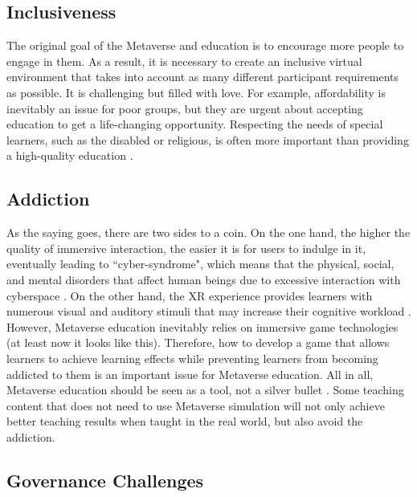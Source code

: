 \documentclass[conference]{IEEEtran}
\begin{document}
\subsection{Inclusiveness}

The original goal of the Metaverse and education is to encourage more people to engage in them. As a result, it is necessary to create an inclusive virtual environment that takes into account as many different participant requirements as possible. It is challenging but filled with love. For example, affordability is inevitably an issue for poor groups, but they are urgent about accepting education to get a life-changing opportunity. Respecting the needs of special learners, such as the disabled or religious, is often more important than providing a high-quality education \cite{tlili2022metaverse}.


\subsection{Addiction}

As the saying goes, there are two sides to a coin. On the one hand, the higher the quality of immersive interaction, the easier it is for users to indulge in it, eventually leading to ``cyber-syndrome", which means that the physical, social, and mental disorders that affect human beings due to excessive interaction with cyberspace \cite{ning2018cyber}. On the other hand, the XR experience provides learners with numerous visual and auditory stimuli that may increase their cognitive workload \cite{parong2021cognitive,maharg2007simulations}. However, Metaverse education inevitably relies on immersive game technologies (at least now it looks like this). Therefore, how to develop a game that allows learners to achieve learning effects while preventing learners from becoming addicted to them is an important issue for Metaverse education. All in all, Metaverse education should be seen as a tool, not a silver bullet \cite{daniel2022introduction,duzmanska2018can}. Some teaching content that does not need to use Metaverse simulation will not only achieve better teaching results when taught in the real world, but also avoid the addiction.


\subsection{Governance Challenges}
\end{document}
